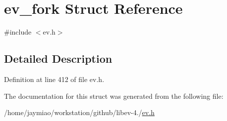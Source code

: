 \hypertarget{structev__fork}{\section{ev\-\_\-fork \-Struct \-Reference}
\label{structev__fork}
}


{\ttfamily \#include $<$ev.\-h$>$}



\subsection{\-Detailed \-Description}


\-Definition at line 412 of file ev.\-h.



\-The documentation for this struct was generated from the following file\-:\begin{DoxyCompactItemize}
\item 
/home/jaymiao/workstation/github/libev-\/4./\hyperlink{ev_8h}{ev.\-h}\end{DoxyCompactItemize}

